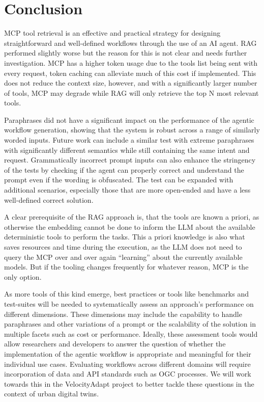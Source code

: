 \section{Conclusion}
\label{sec:conclusion}

MCP tool retrieval is an effective and practical strategy for designing straightforward and
well-defined workflows through the use of an AI agent. RAG performed slightly worse but the
reason for this is not clear and needs further investigation. MCP has a higher token usage due to
the tools list being sent with every request, token caching can alleviate much of this cost if
implemented. This does not reduce the context size, however, and with a significantly larger
number of tools, MCP may degrade while RAG will only retrieve the top N most relevant tools.

Paraphrases did not have a significant impact on the performance of the agentic workflow
generation, showing that the system is robust across a range of similarly worded inputs. Future
work can include a similar test with extreme paraphrases with significantly different semantics
while still containing the same intent and request. Grammatically incorrect prompt inputs can
also enhance the stringency of the tests by checking if the agent can properly correct and
understand the prompt even if the wording is obfuscated. The test can be expanded with additional
scenarios, especially those that are more open-ended and have a less well-defined correct
solution.

A clear prerequisite of the RAG approach is, that the tools are known a priori, as otherwise the
embedding cannot be done to inform the LLM about the available deterministic tools to perform the
tasks. This a priori knowledge is also what saves resources and time during the execution, as the
LLM does not need to query the MCP over and over again ``learning'' about the currently available
models. But if the tooling changes frequently for whatever reason, MCP is the only option.

As more tools of this kind emerge, best practices or tools like benchmarks and test-suites will
be needed to systematically assess an approach's performance on different dimensions. These
dimensions may include the capability to handle paraphrases and other variations of a prompt or
the scalability of the solution in multiple facets such as cost or performance. Ideally, these
assessment tools would allow researchers and developers to answer the question of whether the
implementation of the agentic workflow is appropriate and meaningful for their individual use
cases. Evaluating workflows across different domains will require incorporation of data and API
standards such as OGC processes. We will work towards this in the VelocityAdapt project to better
tackle these questions in the context of urban digital twins.
